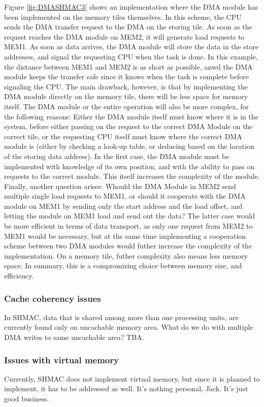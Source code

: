 Figure \ref{fig:DMASHMAC3} shows an implementation where the DMA module has been implemented on the memory tiles themselves.
In this scheme, the CPU sends the DMA transfer request to the DMA on the storing tile.
As soon as the request reaches the DMA module on MEM2, it will generate load requests to MEM1.
As soon as data arrives, the DMA module will store the data in the store addresses, and signal the requesting CPU when the task is done.
In this example, the distance between MEM1 and MEM2 is as short as possible, anwd the DMA module keeps the transfer safe since it knows when the task is complete before signaling the CPU.
The main drawback, however, is that by implementing the DMA module directly on the memory tile, there will be less space for memory itself.
The DMA module or the entire operation will also be more complex, for the following reasons:
Either the DMA module itself must know where it is in the system, before either passing on the request to the correct DMA Module on the correct tile, or the requesting CPU itself must know where the correct DMA module is (either by checking a look-up table, or deducing based on the location of the storing data address).
In the first case, the DMA module must be implemented with knowledge of its own position, and with the ability to pass on requests to the correct module.
This itself increases the complexity of the module.  
Finally, another question arises: Whould the DMA Module in MEM2 send multiple single load requests to MEM1, or should it cooperate with the DMA module on MEM1 by sending only the start address and the load offset, and letting the module on MEM1 load and send out the data?
The latter case would be more efficient in terms of data transport, as only one request from MEM2 to MEM1 would be necessary, but at the same time implementing a cooperation scheme between two DMA modules would futher increase the complexity of the implementation.
On a memory tile, futher complexity also means less memory space.
In summary, this is a compromizing choice between memory size, and efficiency.
 
\subsubsection{Cache coherency issues}
In SHMAC, data that is shared among more than one processing units, are currently found only on uncachable memory area.
What do we do with multiple DMA writes to same uncachable area?
TBA.

\subsubsection{Issues with virtual memory}
Currently, SHMAC does not implement virtual memory, but since it is planned to implement, it has to be addressed as well.
It's nothing personal, Jack. It's just good business. 


